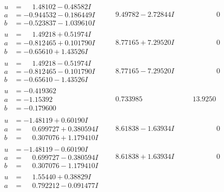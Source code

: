 \documentclass[1p]{elsarticle_modified}
\theoremstyle{definition}
\begin{document}
$$\begin{array}{c|c|c}
\begin{aligned}
u &= \phantom{-}1.48102 - 0.48582 I \\
a &= -0.944532 - 0.186449 I \\
b &= -0.523837 - 1.039610 I\end{aligned}
 & \phantom{-}9.49782 - 2.72844 I & \phantom{-0.000000 } 0 \\ \hline\begin{aligned}
u &= \phantom{-}1.49218 + 0.51974 I \\
a &= -0.812465 + 0.101790 I \\
b &= -0.65610 + 1.43526 I\end{aligned}
 & \phantom{-}8.77165 + 7.29520 I & \phantom{-0.000000 } 0 \\ \hline\begin{aligned}
u &= \phantom{-}1.49218 - 0.51974 I \\
a &= -0.812465 - 0.101790 I \\
b &= -0.65610 - 1.43526 I\end{aligned}
 & \phantom{-}8.77165 - 7.29520 I & \phantom{-0.000000 } 0 \\ \hline\begin{aligned}
u &= -0.419362\phantom{ +0.000000I} \\
a &= -1.15392\phantom{ +0.000000I} \\
b &= -0.179600\phantom{ +0.000000I}\end{aligned}
 & \phantom{-}0.733985\phantom{ +0.000000I} & \phantom{-}13.9250\phantom{ +0.000000I} \\ \hline\begin{aligned}
u &= -1.48119 + 0.60190 I \\
a &= \phantom{-}0.699727 + 0.380594 I \\
b &= \phantom{-}0.307076 + 1.179410 I\end{aligned}
 & \phantom{-}8.61838 - 1.63934 I & \phantom{-0.000000 } 0 \\ \hline\begin{aligned}
u &= -1.48119 - 0.60190 I \\
a &= \phantom{-}0.699727 - 0.380594 I \\
b &= \phantom{-}0.307076 - 1.179410 I\end{aligned}
 & \phantom{-}8.61838 + 1.63934 I & \phantom{-0.000000 } 0 \\ \hline\begin{aligned}
u &= \phantom{-}1.55440 + 0.38829 I \\
a &= \phantom{-}0.792212 - 0.091477 I \\

\end{aligned}
\end{array}$$
\end{document}
